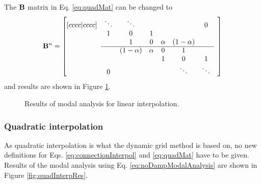 The $\mathbf{B}$ matrix in Eq. \eqref{eq:quadMat} can be changed to
\begin{equation}
    \B^n = \begin{bmatrix}[cccc|cccc]
     & \ddots  &\ddots & & & & 0 & \\
       & 1 & 0 & 1 & & & & \\
      & & 1 & 0 & \alpha & (1-\alpha) & \\ \cline{2-7}
      & & (1-\alpha) & \alpha &0 & 1 & & \\
         & & & &1 & 0 & 1  \\
         & 0 & &  &  &\ddots & \ddots &
    \end{bmatrix}
\end{equation}
and results are shown in Figure \ref{fig:linInterpRes}.
\begin{figure}[h]
    \centering
    \hfill
    \caption{Results of modal analysis for linear interpolation.}\label{fig:linInterpRes}
\end{figure}

\subsubsection{Quadratic interpolation}
As quadratic interpolation is what the dynamic grid method is based on, no new definitions for Eqs. \eqref{eq:connectionInterpol} and \eqref{eq:quadMat} have to be given.
%
%
Results of the modal analysis using Eq. \eqref{eq:noDampModalAnalysis} are shown in Figure \ref{fig:quadInterpRes}.

